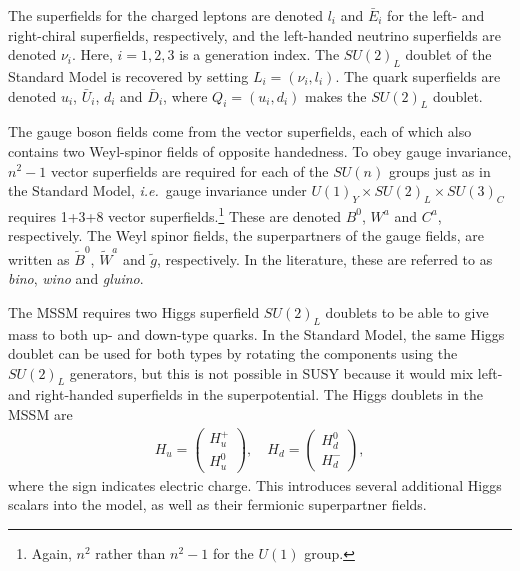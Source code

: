 \documentclass[twoside,english]{uiofysmaster}
\begin{document}
The superfields for the charged leptons are denoted $l_i$ and $\bar E_i$ for the left- and right-chiral superfields, respectively, and the left-handed neutrino superfields are denoted $\nu_i$. Here, $i=1,2,3$ is a generation index. The $SU(2)_L$ doublet of the Standard Model is recovered by setting $L_i = (\nu_i, l_i)$. The quark superfields are denoted $u_i$, $\bar U_i$, $d_i$ and $\bar D_i$, where $Q_i = (u_i, d_i)$ makes the $SU(2)_L$ doublet.

The gauge boson fields come from the vector superfields, each of which also contains two Weyl-spinor fields of opposite handedness. To obey gauge invariance, $n^2-1$ vector superfields are required for each of the $SU(n)$ groups just as in the Standard Model, {\it i.e.}\ gauge invariance under $U(1)_Y\times SU(2)_L \times SU(3)_C$ requires 1+3+8 vector superfields.\footnote{Again, $n^2$ rather than $n^2-1$ for the $U(1)$ group.} These are denoted $B^0$, $W^a$ and $C^a$, respectively. The Weyl spinor fields, the superpartners of the gauge fields, are written as $\tilde B^0$, $\tilde W^a$ and $\tilde g$, respectively. In the literature, these are referred to as {\it bino}, {\it wino} and {\it gluino}. 

The MSSM requires two Higgs superfield $SU(2)_L$ doublets to be able to give mass to both up- and down-type quarks. In the Standard Model, the same Higgs doublet can be used for both types by rotating the components using the $SU(2)_L$ generators, but this is not possible in SUSY because it would mix left- and right-handed superfields in the superpotential. The Higgs doublets in the MSSM are
\begin{align}
	H_u = \begin{pmatrix}
		H_u^+ \\ H_u^0
	\end{pmatrix}, \quad H_d = \begin{pmatrix}
		H_d^0 \\ H_d^-
	\end{pmatrix},
\end{align}
where the sign indicates electric charge. This introduces several additional Higgs scalars into the model, as well as their fermionic superpartner fields.
\end{document}
